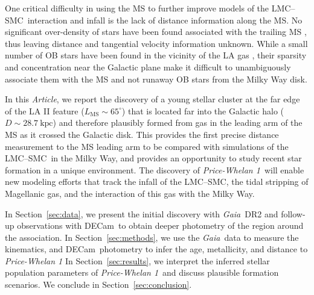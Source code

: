 \documentclass[twocolumn]{aastex62}
\newcommand{\acronym}[1]{{\small{#1}}}
\newcommand{\gaia}{\textsl{Gaia}}
\newcommand{\decam}{DECam}
\newcommand{\DR}[1]{\acronym{DR#1}}
\newcommand{\articlename}{\textsl{Article}}
\newcommand{\sectionname}{Section}
\newcommand{\clustername}{\textsl{Price-Whelan 1}}
\newcommand{\lmcsmc}{LMC--SMC}
\newcommand{\cldist}{\ensuremath{28.7~\textrm{kpc}}}
\begin{document}
One critical difficulty in using the MS to further improve models of the \lmcsmc\ interaction and infall is the lack of distance information along the MS.
No significant over-density of stars have been found associated with the trailing MS \citep{Guhathakurta:1998}, thus leaving distance and tangential velocity information unknown.
While a small number of OB stars have been found in the vicinity of the LA gas \citep{Casetti-Dinescu:2014, Zhang:2017}, their sparsity and concentration near the Galactic plane make it difficult to unambiguously associate them with the MS and not runaway OB stars from the Milky Way disk.

In this \articlename, we report the discovery of a young stellar cluster at the far edge of the LA II feature ($L_{\textrm{MS}} \sim 65^\circ$) that is located far into the Galactic halo ($D \sim \cldist$) and therefore plausibly formed from gas in the leading arm of the MS as it crossed the Galactic disk.
This provides the first precise distance measurement to the MS leading arm to be compared with simulations of the \lmcsmc\ in the Milky Way, and provides an opportunity to study recent star formation in a unique environment.
The discovery of \clustername\ will enable new modeling efforts that track the infall of the \lmcsmc, the tidal stripping of Magellanic gas, and the interaction of this gas with the Milky Way.

In \sectionname~\ref{sec:data}, we present the initial discovery with \gaia\ \DR{2} and follow-up observations with \decam\ to obtain deeper photometry of the region around the association.
In \sectionname~\ref{sec:methods}, we use the \gaia\ data to measure the kinematics, and \decam\ photometry to infer the age, metallicity, and distance to \clustername
In \sectionname~\ref{sec:results}, we interpret the inferred stellar population parameters of \clustername\ and discuss plausible formation scenarios.
We conclude in \sectionname~\ref{sec:conclusion}.
\end{document}
